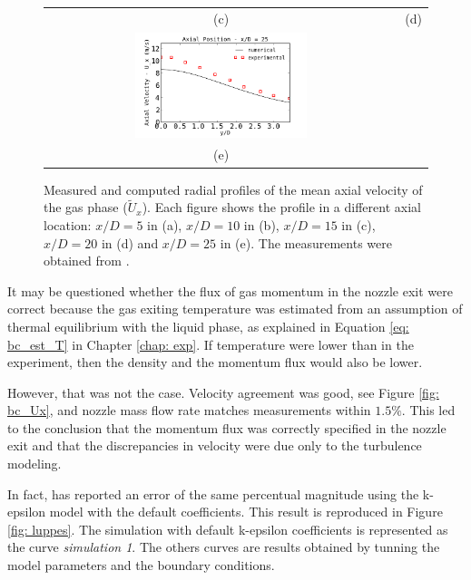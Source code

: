 \begin{figure}[!htb]
\begin{tabular}{cc}
(c) & (d) \\
\includegraphics[width=0.5\textwidth]{./figuras/chap5/Ux/Ux_gas/Ux_gas25.png} &   \\
(e) & \\
\end{tabular}
 \caption{Measured and computed radial profiles of the mean axial velocity of the gas phase ($\tilde{U}_x$). Each figure shows the profile in a different axial location: $x/D=5$ in (a), $x/D=10$ in (b), $x/D=15$ in (c), $x/D=20$ in (d) and $x/D=25$ in (e). The measurements were obtained from \cite{chen}.}
 \label{fig: Ux_gas}
\end{figure}

It may be questioned whether the flux of gas momentum in the nozzle exit were correct because the gas exiting temperature was estimated from an assumption of thermal equilibrium with the liquid phase, as explained in Equation \eqref{eq: bc_est_T} in Chapter \ref{chap: exp}. If temperature were lower than in the experiment, then the density and the momentum flux would also be lower.

However, that was not the case. Velocity agreement was good, see Figure \ref{fig: bc_Ux}, and nozzle mass flow rate matches measurements within $1.5\%$. This led to the conclusion that the momentum flux was correctly specified in the nozzle exit and that the discrepancies in velocity were due only to the turbulence modeling.

In fact, \cite{luppes} has reported an error of the same percentual magnitude using the k-epsilon model with the default coefficients. This result is reproduced in Figure \ref{fig: luppes}. The simulation with default k-epsilon coefficients is represented as the curve \textit{simulation 1}. The others curves are results obtained by tunning the model parameters and the boundary conditions.


